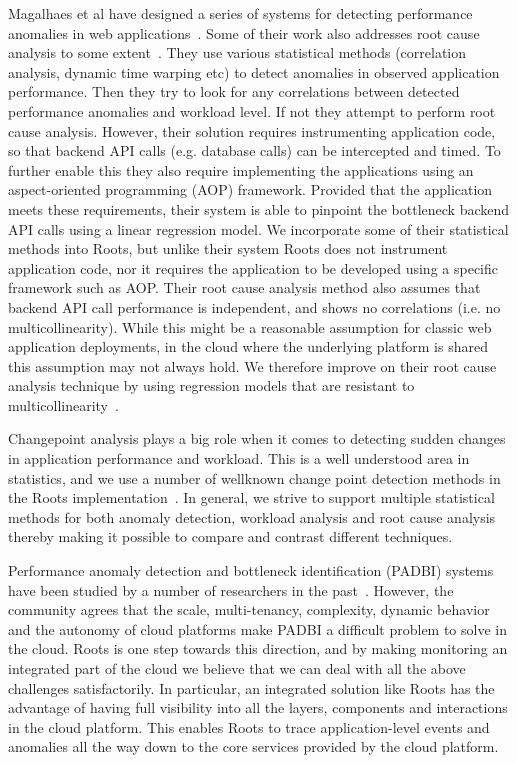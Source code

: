 Magalhaes et al have designed a series of systems for detecting
performance anomalies in web applications~\cite{5598229}. Some of their work
also addresses root cause analysis to some extent~\cite{Magalhaes:2011:RAP:1982185.1982234}. 
They use
various statistical methods (correlation analysis, dynamic time
warping etc) to detect anomalies in observed application
performance. Then they try to look for any correlations between
detected performance anomalies and workload level. If not
they attempt to perform root cause analysis. However, their
solution requires instrumenting application code, so that
backend API calls (e.g. database calls) can be intercepted and timed. To further
enable this they also require implementing the applications 
using an aspect-oriented programming (AOP) framework. Provided that
the application meets these requirements, their system is able to
pinpoint the bottleneck backend API calls using a linear regression
model. We incorporate some of their statistical methods into Roots,
but unlike their system Roots does not instrument application code, nor
it requires the application to be developed using a specific framework
such as AOP. Their root cause analysis method also assumes that
backend API call performance is independent, and shows no correlations
(i.e. no multicollinearity).
While this might be a reasonable assumption for classic web application
deployments, in the cloud where the underlying platform is shared
this assumption may not always hold. We therefore improve on their
root cause analysis technique by using regression models that are
resistant to multicollinearity~\cite{JSSv017i01}.

Changepoint analysis plays a big role when it comes to detecting
sudden changes in application performance and workload. This is a well
understood area in statistics, and we use a number of wellknown 
change point detection methods in the Roots implementation~\cite{killick2012optimal,cl93,bereznay2006did}. 
In general, we strive to support multiple statistical methods for
both anomaly detection, workload analysis and root cause analysis
thereby making it possible to compare and contrast different techniques.

Performance anomaly detection and bottleneck identification (PADBI) systems
have been studied by a number of researchers in the past~\cite{Ibidunmoye:2015:PAD:2808687.2791120}. 
However,
the community agrees that the scale, multi-tenancy, complexity,
dynamic behavior and the autonomy of cloud platforms make PADBI a
difficult problem to solve in the cloud. Roots is one step towards this direction,
and by making monitoring an integrated part of the cloud we believe
that we can deal with all the above challenges satisfactorily. In 
particular, an integrated solution like Roots has the advantage of
having full visibility into all the layers, components and interactions
in the cloud platform. This enables Roots to trace application-level
events and anomalies all the way down to the core services provided
by the cloud platform.

